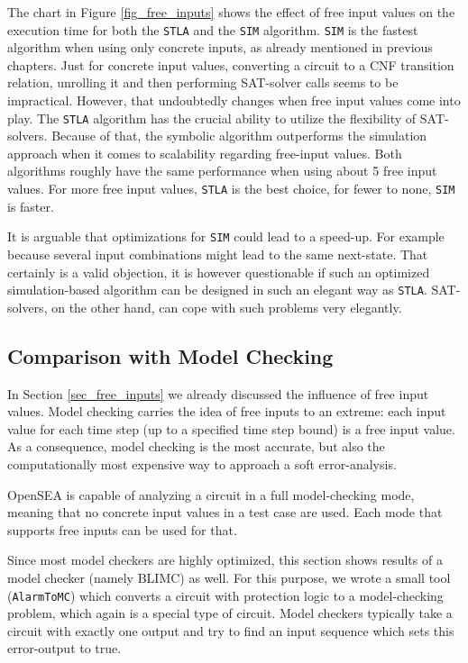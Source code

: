 \documentclass[a4paper,10pt]{article}
\begin{document}
The chart in Figure \ref{fig_free_inputs} shows the effect of free input values on the execution time for both the \texttt{STLA} and the \texttt{SIM} algorithm.
\texttt{SIM} is the fastest algorithm when using only concrete inputs, as already mentioned in previous chapters. Just for concrete input values, converting a circuit to a CNF transition relation, unrolling it and then
performing SAT-solver calls seems to be impractical. However, that undoubtedly changes when free input values come into play. The \texttt{STLA} algorithm has the crucial ability to utilize the flexibility of SAT-solvers.
Because of that, the symbolic algorithm outperforms the simulation approach when it comes to scalability regarding free-input values. Both algorithms roughly have the same performance when using about 5 free input values.
For more free input values, \texttt{STLA} is the best choice, for fewer to none, \texttt{SIM} is faster.


It is arguable that optimizations for \texttt{SIM} could lead to a speed-up. For example because several input combinations
might lead to the same next-state. That certainly is a valid objection, it is however questionable if such an optimized simulation-based algorithm can be designed in such an elegant way as \texttt{STLA}. 
SAT-solvers, on the other hand, can cope with such problems very elegantly.


\subsection{Comparison with Model Checking}
In Section \ref{sec_free_inputs} we already discussed the influence of free input values. 
Model checking carries the idea of free inputs to an extreme: each input value for each time step (up to a specified time step bound) is a free input value. 
As a consequence, model checking is the most accurate, but also the computationally most expensive way to approach a soft error-analysis.

OpenSEA is capable of analyzing a circuit in a full model-checking mode, meaning that no concrete input values in a test case are used. 
Each mode that supports free inputs can be used for that.

Since most model checkers are highly optimized, this section shows results of a model checker (namely BLIMC) as well.
For this purpose, we wrote a small tool (\texttt{AlarmToMC}) which converts a circuit with protection logic to a model-checking problem, which again is a special type of circuit.
Model checkers typically take a circuit with exactly one output and try to find an input sequence which sets this error-output to true. 
\end{document}
